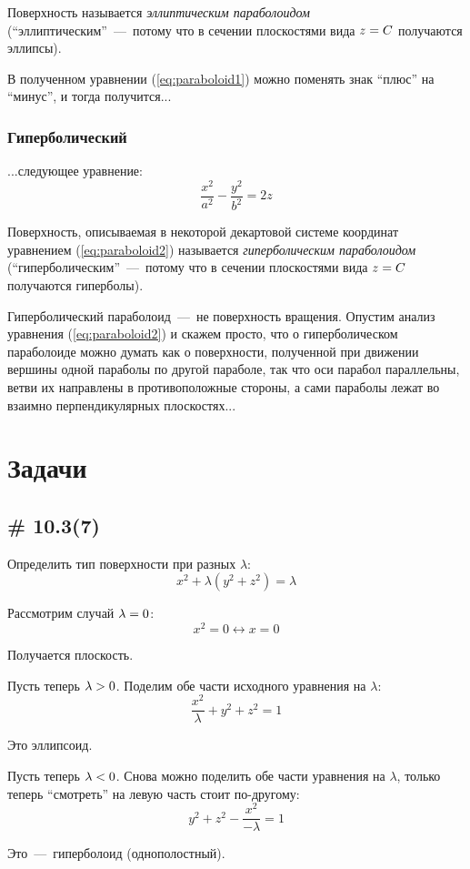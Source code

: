 \documentclass[a4paper,12pt]{article}
\begin{document}
  Поверхность %
  называется \emph{эллиптическим параболоидом} (``эллиптическим''~---~потому что в сечении плоскостями вида $z \hm= C$ получаются эллипсы).
  
  В полученном уравнении (\ref{eq:paraboloid1}) можно поменять знак ``плюс'' на ``минус'', и тогда получится...
  
  
  \subsubsection{Гиперболический}
  
  ...следующее уравнение:
  \begin{equation}
    \label{eq:paraboloid2}
    \frac{x^2}{a^2} - \frac{y^2}{b^2} = 2z
  \end{equation}
  
  Поверхность, описываемая в некоторой декартовой системе координат уравнением (\ref{eq:paraboloid2}) называется \emph{гиперболическим параболоидом} (``гиперболическим''~---~потому что в сечении плоскостями вида $z \hm= C$ получаются гиперболы).
  
  Гиперболический параболоид~---~не поверхность вращения. %
  Опустим анализ уравнения (\ref{eq:paraboloid2}) и скажем просто, что о гиперболическом параболоиде можно думать как о поверхности, полученной при движении вершины одной параболы по другой параболе, так что оси парабол параллельны, ветви их направлены в противоположные стороны, а сами параболы лежат во взаимно перпендикулярных плоскостях...  %
  
  
  \section{Задачи}
  
  
  \subsection{\# 10.3(7)}
  
  Определить тип поверхности при разных $\lambda$:
  \[
    x^2 + \lambda (y^2 + z^2) = \lambda
  \]
  
  \begin{solution}
    Рассмотрим случай $\lambda \hm= 0$:
    \[
      x^2 = 0 \leftrightarrow x = 0
    \]
    
    Получается плоскость.
    
    \medskip
    
    Пусть теперь $\lambda \hm> 0$.
    Поделим обе части исходного уравнения на $\lambda$:
    \[
      \frac{x^2}{\lambda} + y^2 + z^2 = 1
    \]
    
    Это эллипсоид.
    
    \medskip
    
    Пусть теперь $\lambda \hm< 0$.
    Снова можно поделить обе части уравнения на $\lambda$, только теперь ``смотреть'' на левую часть стоит по-другому:
    \[
      y^2 + z^2 - \frac{x^2}{-\lambda} = 1
    \]
    
    Это~---~гиперболоид (однополостный).
  \end{solution}
  
\end{document}
